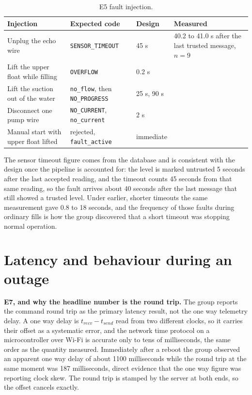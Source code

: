\begin{table}[H]
\caption{E5 fault injection.}
\label{tab:e5}
\centering
\renewcommand{\arraystretch}{1.05}
\begin{tabular}{|p{4.4cm}|p{3.2cm}|p{2.0cm}|p{3.4cm}|}
\hline
\rowcolor[HTML]{B7E1F0}
\textbf{Injection} & \textbf{Expected code} & \textbf{Design} & \textbf{Measured} \\
\hline
Unplug the echo wire & \texttt{SENSOR\_TIMEOUT} & 45 s & 40.2 to 41.0 s after the last trusted message, $n = 9$ \\ \hline
Lift the upper float while filling & \texttt{OVERFLOW} & 0.2 s & \\ \hline
Lift the suction out of the water & \texttt{no\_flow}, then \texttt{NO\_PROGRESS} & 25 s, 90 s & \\ \hline
Disconnect one pump wire & \texttt{NO\_CURRENT}, \texttt{no\_current} & 2 s & \\ \hline
Manual start with upper float lifted & rejected, \texttt{fault\_active} & immediate & \\ \hline
\end{tabular}
\end{table}

The sensor timeout figure comes from the database and is consistent with the design once the pipeline is accounted for: the level is marked untrusted 5 seconds after the last accepted reading, and the timeout counts 45 seconds from that same reading, so the fault arrives about 40 seconds after the last message that still showed a trusted level. Under earlier, shorter timeouts the same measurement gave 0.8 to 18 seconds, and the frequency of those faults during ordinary fills is how the group discovered that a short timeout was stopping normal operation.

\section{Latency and behaviour during an outage}

\textbf{E7, and why the headline number is the round trip.} The group reports the command round trip as the primary latency result, not the one way telemetry delay. A one way delay is $t_{recv} - t_{send}$ read from two different clocks, so it carries their offset as a systematic error, and the network time protocol on a microcontroller over Wi-Fi is accurate only to tens of milliseconds, the same order as the quantity measured. Immediately after a reboot the group observed an apparent one way delay of about 1100 milliseconds while the round trip at the same moment was 187 milliseconds, direct evidence that the one way figure was reporting clock skew. The round trip is stamped by the server at both ends, so the offset cancels exactly.


